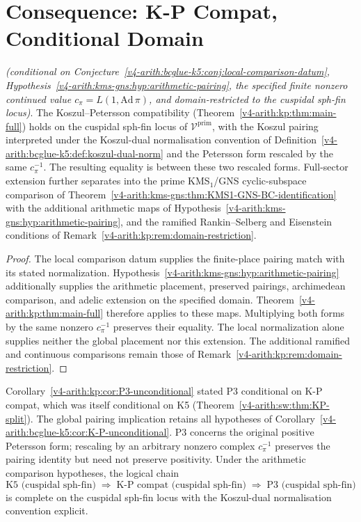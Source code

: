 \section{Consequence: K-P Compat, Conditional Domain}
\label{v4-arith:bcglue-k5:K-P-unconditional}

\begin{corollary}
\label{v4-arith:bcglue-k5:cor:K-P-unconditional}
\emph{(conditional on
Conjecture~\ref{v4-arith:bcglue-k5:conj:local-comparison-datum},
Hypothesis~\ref{v4-arith:kms-gns:hyp:arithmetic-pairing}, the specified
finite nonzero continued value \(c_\pi=L(1,\mathrm{Ad}\,\pi)\), and
domain-restricted to the cuspidal sph-fin locus)}. The Koszul--Petersson compatibility
(Theorem~\ref{v4-arith:kp:thm:main-full}) holds on the cuspidal sph-fin
locus of \(\mathcal{V}^{\mathrm{prim}}\), with the Koszul pairing
interpreted under the Koszul-dual normalisation convention of
Definition~\ref{v4-arith:bcglue-k5:def:koszul-dual-norm} and the
Petersson form rescaled by the same \(c_\pi^{-1}\). The resulting
equality is between these two rescaled forms. Full-sector
extension further separates into the prime KMS\(_1\)/GNS cyclic-subspace
comparison of Theorem~\ref{v4-arith:kms-gns:thm:KMS1-GNS-BC-identification}
with the additional arithmetic maps of
Hypothesis~\ref{v4-arith:kms-gns:hyp:arithmetic-pairing},
and the ramified Rankin--Selberg and Eisenstein conditions of
Remark~\ref{v4-arith:kp:rem:domain-restriction}.
\end{corollary}

\begin{proof}
The local comparison datum supplies the finite-place pairing match
with its stated normalization. Hypothesis~\ref{v4-arith:kms-gns:hyp:arithmetic-pairing}
additionally supplies the arithmetic placement, preserved pairings,
archimedean comparison, and adelic extension on the specified domain.
Theorem~\ref{v4-arith:kp:thm:main-full} therefore applies to these
maps. Multiplying both forms by the same nonzero \(c_\pi^{-1}\)
preserves their equality. The local normalization alone supplies
neither the global placement nor this extension. The additional ramified and continuous
comparisons remain those of Remark~\ref{v4-arith:kp:rem:domain-restriction}.
\end{proof}

\begin{remark}[impact on P3]
\label{v4-arith:bcglue-k5:rem:P3-impact}
Corollary~\ref{v4-arith:kp:cor:P3-unconditional} stated P3 conditional on
K-P compat, which was itself conditional on K5
(Theorem~\ref{v4-arith:sw:thm:KP-split}).
The global pairing implication retains all hypotheses of
Corollary~\ref{v4-arith:bcglue-k5:cor:K-P-unconditional}.
P3 concerns the original positive Petersson form; rescaling by an
arbitrary nonzero complex \(c_\pi^{-1}\) preserves the pairing identity
but need not preserve positivity. Under the arithmetic comparison
hypotheses, the logical chain
\[
\text{K5 (cuspidal sph-fin)}
\;\Rightarrow\;
\text{K-P compat (cuspidal sph-fin)}
\;\Rightarrow\;
\text{P3 (cuspidal sph-fin)}
\]
is complete on the cuspidal sph-fin locus with the Koszul-dual
normalisation convention explicit.
\end{remark}

